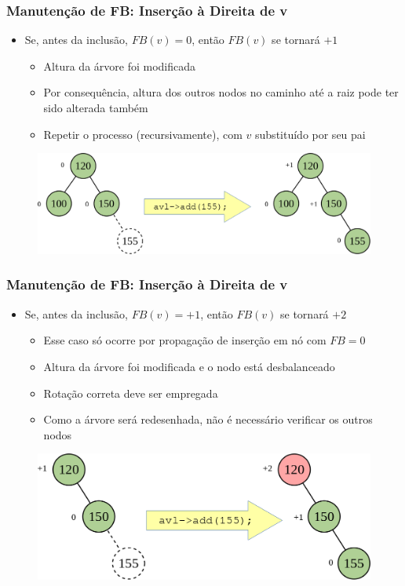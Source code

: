 \documentclass[aspectratio=169]{beamer}
\begin{document}
\begin{frame}\frametitle{Manutenção de FB: Inserção à Direita de v}
\begin{itemize}
	\item Se, antes da inclusão, $FB(v) = 0$, então $FB(v)$ se tornará $+1$
	\begin{itemize}
		\item Altura da árvore foi modificada
		\item Por consequência, altura dos outros nodos no caminho até a raiz pode ter sido alterada também
		\item Repetir o processo (recursivamente), com $v$ substituído por seu pai
	\end{itemize}
\end{itemize}
\begin{figure}[h]
	\centering
	\includegraphics[height=0.35\paperheight]{imagens/avl_ins_dir2.png}
\end{figure}
\end{frame}

\begin{frame}\frametitle{Manutenção de FB: Inserção à Direita de v}
\begin{itemize}
	\item Se, antes da inclusão, $FB(v) = +1$, então $FB(v)$ se tornará $+2$
	\begin{itemize}
		\item Esse caso só ocorre por propagação de inserção em nó com $FB = 0$
		\item Altura da árvore foi modificada e o nodo está desbalanceado
		\item Rotação correta deve ser empregada
		\item Como a árvore será redesenhada, não é necessário verificar os outros nodos
		\end{itemize}
\end{itemize}
\begin{figure}[h]
	\centering
	\includegraphics[height=0.35\paperheight]{imagens/avl_ins_dir3.png}
\end{figure}
\end{frame}
\end{document}
